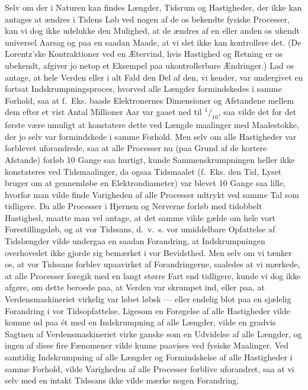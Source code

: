 \documentclass[12pt,a4paper]{article}
\newcommand{\opage}[1]{\marginnote{\footnotesize\textit{[#1]}}}
\begin{document}
Selv om der i Naturen kan findes Længder, Tidsrum og Hastigheder, der ikke kan
antages at ændres i Tidens Løb ved nogen af de os bekendte fysiske Processer,
kan vi dog ikke udelukke den Mulighed, at de ændres af en eller anden os ukendt
universel Aarsag og paa en saadan Maade, at vi slet ikke kan kontrollere det.
(De Lorentz'ske Kontraktioner ved en Ætervind, hvis Hastighed og Retning er os
ubekendt, afgiver jo netop et Eksempel paa ukontrollerbare Ændringer.) Lad os
antage, at hele Verden eller i alt Fald den Del af den, vi kender, var
undergivet en fortsat Indskrumpningsproces, hvorved alle Længder formindskedes
i samme Forhold, saa at f.~Eks. baade Elektronernes Dimensioner og Afstandene
mellem dem efter et vist Antal Millioner Aar var gaaet ned til
$^{1}\!/_{10}$, saa vilde det for det første være umuligt at konstatere dette
ved Længde\-%
\opage{12}maalinger med Maalestokke, der jo selv var formindskede i samme Forhold. Men
selv om alle Hastigheder var forblevet uforandrede, saa at alle Processer nu
(paa Grund af de kortere Afstande) forløb 10 Gange saa hurtigt, kunde
Sammenskrumpningen heller ikke konstateres ved Tidsmaalinger, da ogsaa
Tidsmaalet (f.~Eks. den Tid, Lyset bruger om at gennemløbe en Elektrondiameter)
var blevet 10 Gange saa lille, hvorfor man vilde finde Varigheden af alle
Processer udtrykt ved samme Tal som tidligere. Da alle Processer i Hjernen og
Nerverne forløb med tidobbelt Hastighed, maatte man vel antage, at det samme
vilde gælde om hele vort Forestillingsløb, og at vor Tidssans, d.~v.~s. vor
umiddelbare Opfattelse af Tidslængder vilde undergaa en saadan Forandring, at
\guillemotright Indskrumpningen\guillemotleft{} overhovedet ikke gjorde sig
bemærket i vor Bevidsthed. Men selv om vi tænker os, at vor Tidssans forblev
upaavirket af Forandringerne, saaledes at vi mærkede, at alle Processer foregik
med en langt større Fart end tidligere, kunde vi dog ikke afgøre, om dette
beroede paa, at Verden var skrumpet ind, eller paa, at Verdensmaskineriet
virkelig var løbet løbsk --- eller endelig blot paa en sjælelig Forandring i
vor Tidsopfattelse. Ligesom en Forøgelse af alle Hastigheder vilde komme ud paa
ét med en Indskrumpning af alle Længder, vilde en gradvis Sagtnen af
Verdensmaskineriet virke ganske som en Udvidelse af alle Længder, og ingen af
disse fire Fænomener vilde kunne paavises ved fysiske Maalinger. Ved samtidig
Indskrumpning af alle Længder og Formindskelse af alle Hastigheder i samme
Forhold, vilde Varigheden af alle Processer forblive uforandret, saa at vi selv
med en intakt Tidssans ikke vilde mærke nogen Forandring.
\end{document}
